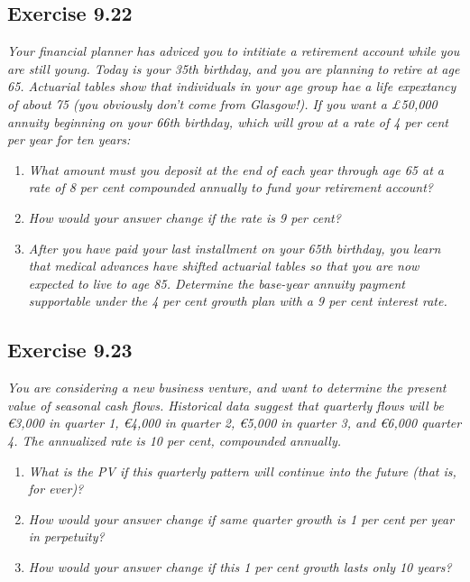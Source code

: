 \documentclass[]{book}
\newcommand{\euro}{€}
\theoremstyle{definition}
\theoremstyle{definition}
\theoremstyle{remark}
\begin{document}
\subsection{Exercise 9.22}\label{exercise-9.22}

\emph{Your financial planner has adviced you to intitiate a retirement
account while you are still young. Today is your 35th birthday, and you
are planning to retire at age 65. Actuarial tables show that individuals
in your age group hae a life expextancy of about 75 (you obviously don't
come from Glasgow!). If you want a £50,000 annuity beginning on your
66th birthday, which will grow at a rate of 4 per cent per year for ten
years:} \citep[p.309]{book}

\begin{enumerate}
\def\labelenumi{\alph{enumi}.}
\item
  \emph{What amount must you deposit at the end of each year through age
  65 at a rate of 8 per cent compounded annually to fund your retirement
  account?} \citep[p.309]{book}
\item
  \emph{How would your answer change if the rate is 9 per cent?}
  \citep[p.309]{book}
\item
  \emph{After you have paid your last installment on your 65th birthday,
  you learn that medical advances have shifted actuarial tables so that
  you are now expected to live to age 85. Determine the base-year
  annuity payment supportable under the 4 per cent growth plan with a 9
  per cent interest rate.} \citep[p.309]{book}
\end{enumerate}

\subsection{Exercise 9.23}\label{exercise-9.23}

\emph{You are considering a new business venture, and want to determine
the present value of seasonal cash flows. Historical data suggest that
quarterly flows will be \euro{}3,000 in quarter 1, \euro{}4,000 in
quarter 2, \euro{}5,000 in quarter 3, and \euro{}6,000 quarter 4. The
annualized rate is 10 per cent, compounded annually.}
\citep[p.309]{book}

\begin{enumerate}
\def\labelenumi{\alph{enumi}.}
\item
  \emph{What is the PV if this quarterly pattern will continue into the
  future (that is, for ever)?} \citep[p.309]{book}
\item
  \emph{How would your answer change if same quarter growth is 1 per
  cent per year in perpetuity?} \citep[p.309]{book}
\item
  \emph{How would your answer change if this 1 per cent growth lasts
  only 10 years?} \citep[p.309]{book}
\end{enumerate}
\end{document}
